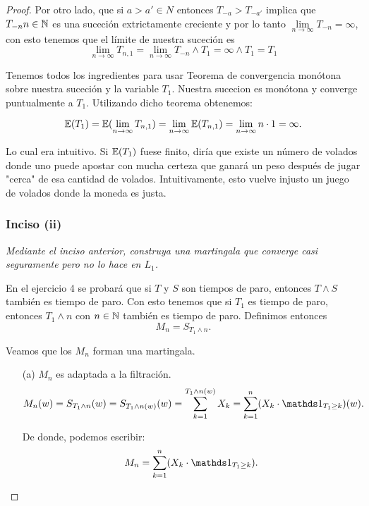 \begin{proof}
		Por otro lado, que si $a>a' \in N$ entonces $T_{-a} > T_{-a'}$ implica que $T_{-n} n \in \mathbb{N}$ es 
		una suceción extrictamente creciente y por lo tanto 
		$\lim\limits_{n \rightarrow \infty} T_{-n} = \infty$, con esto tenemos que el límite de nuestra 
		suceción es 
		$$		
		\lim_{n\rightarrow\infty} T_{n,1} = 
		\lim_{n\rightarrow\infty} T_{-n} \wedge T_1 = 
		\infty \wedge T_1 = 
		T_1
		$$

		Tenemos todos los ingredientes para usar Teorema de convergencia monótona sobre nuestra suceción
		y la variable $T_1$. Nuestra sucecion es monótona y converge puntualmente a $T_1$. Utilizando
		dicho teorema obtenemos:
		
		$$
		\mathbb{E}(T_1) = 
		\mathbb{E}(\lim_{n\rightarrow\infty} T_{n,1}) = 
		\lim_{n\rightarrow\infty} \mathbb{E}(T_{n,1}) = 
		\lim_{n\rightarrow\infty} n\cdot 1 =
		\infty.
		$$
		
		Lo cual era intuitivo. Si $\mathbb{E}(T_1)$ fuese finito, diría que existe un número de volados donde
		uno puede apostar con mucha certeza que ganará un peso después de jugar "cerca" de esa cantidad
		de volados. Intuitivamente, esto vuelve injusto un juego de volados donde la moneda es
		justa.\\
		
	\subsubsection{Inciso (ii)}
	\emph
	{	
		Mediante el inciso anterior, construya una martingala que converge 
		casi seguramente pero no lo hace en $L_1$.\\
	}
		
		En el ejercicio 4 se probará que si $T$ y $S$ son tiempos de paro, entonces $T\wedge S$ también 
		es tiempo de paro. Con esto tenemos que si $T_1$ es tiempo de paro, entonces $T_1 \wedge n$ con 
		$n \in \mathbb{N}$ también es tiempo de paro. Definimos entonces 
		$$M_n = S_{T_1 \wedge n}.$$
		
		Veamos que los $M_n$ forman una martingala.
		
		\begin{itemize}
			\item[(a)] 
				$M_n$ es adaptada a la filtración.
				\begin{align}
					M_n(w) = S_{T_1 \wedge n}(w) = 
					S_{T_1 \wedge n (w)}(w) = 
					\sum_{k=1}^{T_1 \wedge n (w)} X_k = 
					\sum_{k=1}^{n} (X_k \cdot \indic_{T_1 \geq k})(w).
				\end{align}
				
				De donde, podemos escribir:
				\begin{align}\label{problema1_3:descomposicion_de_M_n}
					M_n = \sum_{k=1}^{n} (X_k \cdot \indic_{T_1 \geq k}).
				\end{align}								 		
				

\end{itemize}
\end{proof}
